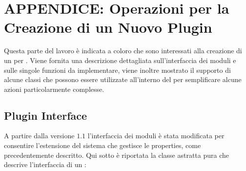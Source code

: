 \chapter*{APPENDICE: Operazioni per la Creazione di un Nuovo Plugin}


\label{appendice_a}


Questa parte del lavoro è indicata a coloro che sono interessati alla creazione di un \plugin{} per \visualnetkit{}. Viene fornita una descrizione dettagliata sull'interfaccia dei moduli e sulle singole funzioni da implementare, viene inoltre mostrato il supporto di alcune classi che possono essere utilizzate all'interno del \plugin{} per semplificare alcune azioni particolarmente complesse.

\section*{Plugin Interface}
A partire dalla versione $1.1$ l'interfaccia dei moduli è stata modificata per consentire l'estensione del sistema che gestisce le properties, come precedentemente descritto. Qui sotto è riportata la classe astratta pura che descrive l'interfaccia di un \plugin{}:


